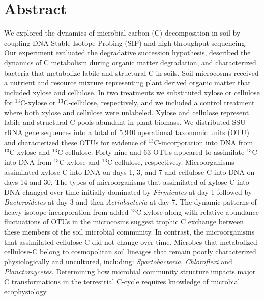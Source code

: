 \section{Abstract} We explored the dynamics of microbial carbon (C)
decomposition in soil by coupling DNA Stable Isotope Probing (SIP) and high
throughput sequencing. Our experiment evaluated the degradative succession
hypothesis, described the dynamics of C metabolism during organic matter
degradation, and characterized bacteria that metabolize labile and structural
C in soils. Soil microcosms received a nutrient and resource mixture
representing plant derived organic matter that included xylose and cellulose.
In two treatments we substituted xylose or cellulose for $^{13}$C-xylose or
$^{13}$C-cellulose, respectively, and we included a control treatment where both
xylose and cellulose were unlabeled. Xylose and cellulose represent labile and
structural C pools abundant in plant biomass. We distributed SSU rRNA gene
sequences into a total of 5,940 operational taxonomic units (OTU) and
characterized these OTUs for evidence of $^{13}$C-incorporation into DNA from
$^{13}$C-xylose and $^{13}$C-cellulose. Forty-nine and 63 OTUs appeared to assimilate $^{13}$C
into DNA from $^{13}$C-xylose and $^{13}$C-cellulose, respectively. Microorganisms
assimilated xylose-C into DNA on days 1, 3, and
7 and cellulose-C into DNA on days 14 and 30. The types of microorganisms that
assimilated of xylose-C into DNA changed over time initially dominated by
\textit{Firmicutes} at day 1 followed by \textit{Bacteroidetes} at day 3 and
then \textit{Actinbacteria} at day 7. The dynamic patterns of heavy isotope
incorporation from added $^{13}$C-xylose along with relative abundance fluctuations
of OTUs in the microcosms suggest trophic C exchange between these members of
the soil microbial community. In contrast, the microorganisms that assimilated
cellulose-C did not change over time. Microbes that metabolized cellulose-C
belong to cosmopolitan soil lineages that remain poorly characterized
physiologically and uncultured, including: \textit{Spartobacteria},
\textit{Chloroflexi} and \textit{Planctomycetes}. Determining how microbial
community structure impacts major C transformations in the terrestrial C-cycle
requires knowledge of microbial ecophysiology.
